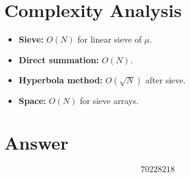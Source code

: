 \documentclass[11pt]{article}
\begin{document}
\section{Complexity Analysis}

\begin{itemize}
\item \textbf{Sieve:} $O(N)$ for linear sieve of $\mu$.
\item \textbf{Direct summation:} $O(N)$.
\item \textbf{Hyperbola method:} $O(\sqrt{N})$ after sieve.
\item \textbf{Space:} $O(N)$ for sieve arrays.
\end{itemize}

\section{Answer}

\[
\boxed{70228218}
\]
\end{document}
